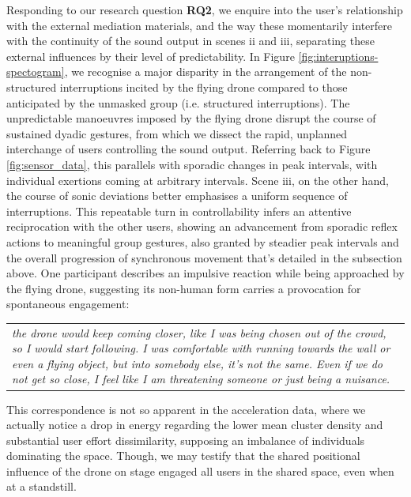 Responding to our research question \textbf{RQ2}, we enquire into the user's relationship with the external mediation materials, and the way these momentarily interfere with the continuity of the sound output in scenes ii and iii, separating these external influences by their level of predictability. In Figure \ref{fig:interuptions-spectogram}, we recognise a major disparity in the arrangement of the non-structured interruptions incited by the flying drone compared to those anticipated by the unmasked group (i.e. structured interruptions). The unpredictable manoeuvres imposed by the flying drone disrupt the course of sustained dyadic gestures, from which we dissect the rapid, unplanned interchange of users controlling the sound output. Referring back to Figure \ref{fig:sensor_data}, this parallels with sporadic changes in peak intervals, with individual exertions coming at arbitrary intervals. Scene iii, on the other hand, the course of sonic deviations better emphasises a uniform sequence of interruptions. This repeatable turn in controllability infers an attentive reciprocation with the other users, showing an advancement from sporadic reflex actions to meaningful group gestures, also granted by steadier peak intervals and the overall progression of synchronous movement that's detailed in the subsection above. One participant describes an impulsive reaction while being approached by the flying drone, suggesting its non-human form carries a provocation for spontaneous engagement:

\begin{center}
\begin{tabular}{ p{13cm}}
\textit{the drone would keep coming closer, like I was being chosen out of the crowd, so I would start following. I was comfortable with running towards the wall or even a flying object, but into somebody else, it's not the same. Even if we do not get so close, I feel like I am threatening someone or just being a nuisance.}
\end{tabular}
\end{center}

This correspondence is not so apparent in the acceleration data, where we actually notice a drop in energy regarding the lower mean cluster density and substantial user effort dissimilarity, supposing an imbalance of individuals dominating the space. Though, we may testify that the shared positional influence of the drone on stage engaged all users in the shared space, even when at a standstill.

